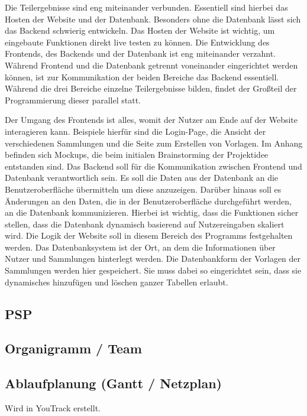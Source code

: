 \documentclass[a4paper, 12pt]{article}
\begin{document}
    Die Teilergebnisse sind eng miteinander verbunden.
    Essentiell sind hierbei das Hosten der Website und der Datenbank.
    Besonders ohne die Datenbank lässt sich das Backend schwierig entwickeln.
    Das Hosten der Website ist wichtig, um eingebaute Funktionen direkt live testen zu können.
    Die Entwicklung des Frontends, des Backends und der Datenbank ist eng miteinander verzahnt.
    Während Frontend und die Datenbank getrennt voneinander eingerichtet werden können, ist zur Kommunikation der beiden Bereiche das Backend essentiell.
    Während die drei Bereiche einzelne Teilergebnisse bilden, findet der Großteil der Programmierung dieser parallel statt.

    Der Umgang des Frontends ist alles, womit der Nutzer am Ende auf der Website interagieren kann.
    Beispiele hierfür sind die Login-Page, die Ansicht der verschiedenen Sammlungen und die Seite zum Erstellen von Vorlagen.
    Im Anhang befinden sich Mockups, die beim initialen Brainstorming der Projektidee entstanden sind.
    Das Backend soll für die Kommunikation zwischen Frontend und Datenbank verantwortlich sein.
    Es soll die Daten aus der Datenbank an die Benutzeroberfläche übermitteln um diese anzuzeigen.
    Darüber hinaus soll es Änderungen an den Daten, die in der Benutzeroberfläche durchgeführt werden, an die Datenbank kommunizieren.
    Hierbei ist wichtig, dass die Funktionen sicher stellen, dass die Datenbank dynamisch basierend auf Nutzereingaben skaliert wird.
    Die Logik der Website soll in diesem Bereich des Programms festgehalten werden.
    Das Datenbanksystem ist der Ort, an dem die Informationen über Nutzer und Sammlungen hinterlegt werden.
    Die Datenbankform der Vorlagen der Sammlungen werden hier gespeichert.
    Sie muss dabei so eingerichtet sein, dass sie dynamisches hinzufügen und löschen ganzer Tabellen erlaubt.

    \subsection{PSP}
    
    \subsection{Organigramm / Team}
    
    \subsection{Ablaufplanung (Gantt / Netzplan)}
    Wird in YouTrack erstellt.
    
\end{document}

